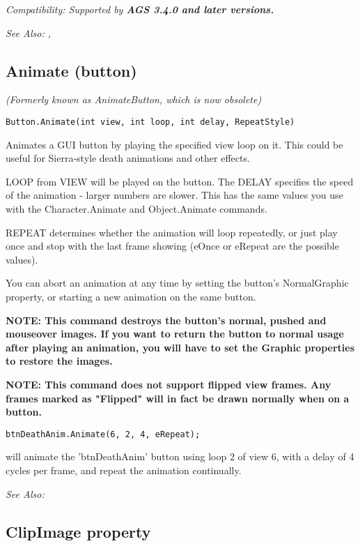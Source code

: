 \it{Compatibility:} Supported by \bf{AGS 3.4.0} and later versions.

\it{See Also:} ,


\subsection{Animate (button)}\label{Button.Animate}%

\it{(Formerly known as AnimateButton, which is now obsolete)}

\begin{verbatim}
Button.Animate(int view, int loop, int delay, RepeatStyle)
\end{verbatim}
Animates a GUI button by playing the specified view loop on it. This could be
useful for Sierra-style death animations and other effects.

LOOP from VIEW will be played on the button. The DELAY specifies the speed of
the animation - larger numbers are slower. This has the same values you use
with the Character.Animate and Object.Animate commands.

REPEAT determines whether the animation will loop repeatedly, or just play once and stop
with the last frame showing (eOnce or eRepeat are the possible values).

You can abort an animation at any time by setting the button's NormalGraphic property, or
starting a new animation on the same button.

\bf{NOTE:} This command destroys the button's normal, pushed and mouseover images. If you
want to return the button to normal usage after playing an animation, you will have to set
the Graphic properties to restore the images.

\bf{NOTE:} This command does not support flipped view frames. Any frames marked as "Flipped"
will in fact be drawn normally when on a button.

\begin{verbatim}
btnDeathAnim.Animate(6, 2, 4, eRepeat);
\end{verbatim}
will animate the 'btnDeathAnim' button using loop 2 of view 6, with a delay of 4
cycles per frame, and repeat the animation continually.

\it{See Also:} 


\subsection{ClipImage property}\label{Button.ClipImage}%

